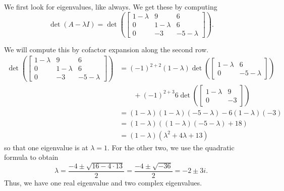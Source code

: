 \documentclass{ximera}
\begin{document}
\begin{exampleSol}
    We first look for eigenvalues, like always. We get these by computing
    \[ 
        \det(A - \lambda I) = \det 
        \left( 
            \begin{bmatrix} 
                1-\lambda & 9 & 6 \\ 
                0 & 1-\lambda & 6 \\ 
                0 & -3 & -5-\lambda 
            \end{bmatrix}
        \right).
    \]
    
    We will compute this by cofactor expansion along the second row.
    \[ 
        \begin{split}
            \det 
            \left( 
                \begin{bmatrix} 
                    1-\lambda & 9 & 6 \\ 
                    0 & 1-\lambda & 6 \\ 
                    0 & -3 & -5-\lambda 
                \end{bmatrix}
            \right) 
            &= (-1)^{2+2}(1-\lambda)\det
            \left(
                \begin{bmatrix}1
                    -\lambda & 6 \\ 
                    0 & -5-\lambda 
                \end{bmatrix}
            \right) \\ 
            &\qquad + (-1)^{2+3} 6 \det
            \left( 
                \begin{bmatrix} 
                    1-\lambda & 9 \\ 
                    0 & -3 
                \end{bmatrix}
            \right) \\
            &= (1-\lambda)(1-\lambda)(-5-\lambda) - 6(1-\lambda)(-3) \\
            &= (1-\lambda)((1-\lambda)(-5-\lambda) + 18) \\
            &= (1-\lambda)(\lambda^2 + 4\lambda + 13)
        \end{split} 
    \]
    so that one eigenvalue is at $\lambda = 1$. For the other two, we use the quadratic formula to obtain \[ \lambda = \frac{-4 \pm \sqrt{16 - 4\cdot 13}}{2} = \frac{-4 \pm \sqrt{-36}}{2} = -2 \pm 3i. \] Thus, we have one real eigenvalue and two complex eigenvalues. 
    

\end{exampleSol}
\end{document}
